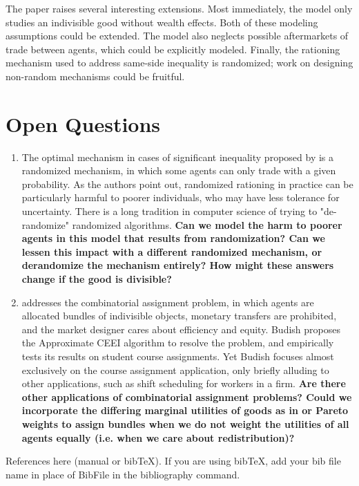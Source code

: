 \documentclass[JEL]{AEA}
\begin{document}
The paper raises several interesting extensions. Most immediately, the model only studies an indivisible good without wealth effects. Both of these modeling assumptions could be extended. The model also neglects possible aftermarkets of trade between agents, which could be explicitly modeled. Finally, the rationing mechanism used to address same-side inequality is randomized; work on designing non-random mechanisms could be fruitful.


\section{Open Questions}

\begin{enumerate}
    \item The optimal mechanism in cases of significant inequality proposed by \cite{dworczak-2020} is a randomized mechanism, in which some agents can only trade with a given probability. As the authors point out, randomized rationing in practice can be particularly harmful to poorer individuals, who may have less tolerance for uncertainty. There is a long tradition in computer science of trying to "de-randomize" randomized algorithms. \textbf{Can we model the harm to poorer agents in this model that results from randomization? Can we lessen this impact with a different randomized mechanism, or derandomize the mechanism entirely? How might these answers change if the good is divisible?}
    
    \item \cite{budish-2008} addresses the combinatorial assignment problem, in which agents are allocated bundles of indivisible objects, monetary transfers are prohibited, and the market designer cares about efficiency and equity. Budish proposes the Approximate CEEI algorithm to resolve the problem, and empirically tests its results on student course assignments. Yet Budish focuses almost exclusively on the course assignment application, only briefly alluding to other applications, such as shift scheduling for workers in a firm. \textbf{Are there other applications of combinatorial assignment problems? Could we incorporate the differing marginal utilities of goods as in \cite{dworczak-2020} or Pareto weights to assign bundles when we do not weight the utilities of all agents equally (i.e. when we care about redistribution)?}
\end{enumerate}

References here (manual or bibTeX). If you are using bibTeX, add your bib file 
name in place of BibFile in the bibliography command.



\end{document}
